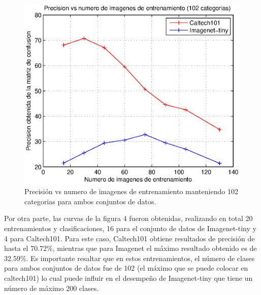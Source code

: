 \documentclass[10pt,twocolumn,letterpaper]{article}
\begin{document}
\begin{figure}[t]
\begin{center}
   \includegraphics[width=1\linewidth]{train.eps}
\end{center}
   \caption{Precisión vs numero de imagenes de entrenamiento manteniendo 102 categorias para ambos conjuntos de datos.}
\label{fig:seg}
\end{figure}

Por otra parte, las curvas de la figura 4 fueron obtenidas, realizando en total 20 entrenamientos y clasificaciones, 16 para el conjunto de datos de Imagenet-tiny y 4 para Caltech101. Para este caso, Caltech101 obtiene resultados de precisión de hasta el 70.72\%, mientras que para Imagenet el máximo resultado obtenido es de 32.59\%. Es importante resaltar que en estos entrenamientos, el número de clases para ambos conjuntos de datos fue de 102 (el máximo que se puede colocar en caltech101) lo cual puede influir en el desempeño de Imagenet-tiny que tiene un número de máximo 200 clases.
\end{document}
